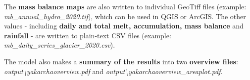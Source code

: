 \documentclass[15pt]{extarticle}
\begin{document}
The \textbf{mass balance maps} are also written to individual GeoTiff files (example: \textit{mb\_annual\_hydro\_2020.tif}), which can be used in QGIS or ArcGIS. The other values - including \textbf{daily and total melt, accumulation, mass balance} and \textbf{rainfall} - are written to plain-text CSV files (example: \textit{mb\_daily\_series\_glacier\_2020.csv}).

The model also makes a \textbf{summary of the results} into two \textbf{overview files}: \textit{output\textbackslash yakarcha\textunderscore overview.pdf} and \textit{output\textbackslash yakarcha\textunderscore overview\_areaplot.pdf}.
\end{document}
